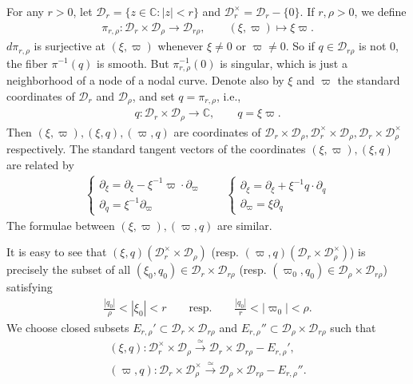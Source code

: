 \documentclass[12pt,b5paper,notitlepage]{report}
\theoremstyle{definition}
\theoremstyle{plain}
\newcommand{\mc}{\mathcal}
\newcommand{\mbb}{\mathbb}
\newcommand{\Cbb}{\mathbb C}
\numberwithin{equation}{section}
\begin{document}
For any $r>0$, let  $\mc D_r=\{z\in\mbb C:|z|<r \}$ and $\mc D_r^\times=\mc D_r-\{0\}$.\index{Dr@$\mc D_r,\mc D_r^\times$} If $r,\rho>0$, we define \index{zz@$\pi_{r,\rho}:\mc D_r\times\mc D_\rho\rightarrow\mc D_{r\rho}$}
\begin{align}
\pi_{r,\rho}:\mc D_r\times\mc D_\rho\rightarrow\mc D_{r\rho},\qquad (\xi,\varpi)\mapsto \xi\varpi.
\end{align}
$d\pi_{r,\rho}$ is surjective at $(\xi,\varpi)$ whenever $\xi\neq 0$ or $\varpi\neq 0$. So if $q\in\mc D_{r\rho}$ is not $0$, the fiber $\pi^{-1}(q)$ is smooth. But $\pi_{r,\rho}^{-1}(0)$ is singular, which is just a neighborhood of a node of a nodal curve. Denote also by $\xi$ and $\varpi$ the standard coordinates of $\mc D_r$ and $\mc D_\rho$, and set $q=\pi_{r,\rho}$, i.e.,
\begin{align*}
q:\mc D_r\times\mc D_\rho\rightarrow\Cbb,\qquad q=\xi\varpi.
\end{align*}
Then $(\xi,\varpi),(\xi,q),(\varpi,q)$ are coordinates  of $\mc D_r\times \mc D_\rho,\mc D_r^\times\times \mc D_\rho,\mc D_r\times \mc D_\rho^\times$ respectively. The standard tangent vectors of the coordinates $(\xi,\varpi),(\xi,q)$ are related by
\begin{gather}
\left\{ \begin{array}{l}
\partial_\xi=\partial_\xi-\xi^{-1}\varpi\cdot\partial_\varpi\\
\partial_q=\xi^{-1}\partial_\varpi
\end{array} \right.
\qquad
\left\{ \begin{array}{l}
\partial_\xi=\partial_\xi+\xi^{-1}q\cdot\partial_q\\
\partial_\varpi=\xi\partial_q
\end{array} \right.\label{eq74}
\end{gather}
The formulae between $(\xi,\varpi),(\varpi,q)$ are similar.


It is easy to see that  $(\xi,q)(\mc D_r^\times\times\mc D_\rho)$ (resp. $(\varpi,q)(\mc D_r\times\mc D_\rho^\times)$) is precisely the subset of all $(\xi_0,q_0)\in\mc D_r\times\mc D_{r\rho}$ (resp. $(\varpi_0,q_0)\in\mc D_\rho\times\mc D_{r\rho}$) satisfying
\begin{align}
\frac{|q_0|}{\rho}<|\xi_0|<r\qquad\text{resp.}\qquad  \frac{|q_0|}{r}<|\varpi_0|<\rho.\label{eq181}
\end{align}
We choose closed subsets $E_{r,\rho}'\subset \mc D_r\times\mc D_{r\rho}$ and $E_{r,\rho}''\subset\mc D_\rho\times\mc D_{r\rho}$ such that
\begin{gather}
(\xi,q):\mc D_r^\times\times\mc D_\rho\xrightarrow{\simeq}\mc D_r\times\mc D_{r\rho}-E_{r,\rho}',\nonumber\\
(\varpi,q): \mc D_r\times\mc D_\rho^\times\xrightarrow{\simeq}\mc D_\rho\times\mc D_{r\rho}-E_{r,\rho}''.\label{eq18}
\end{gather}
\end{document}

